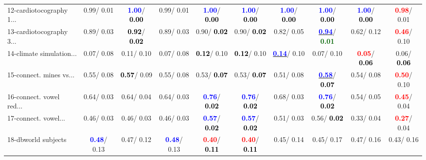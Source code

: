 \begin{table}[h]
\begin{center}
{\begin{tabular}{lc|c|c|c|c|c|c|c|c}
12-cardiotocography 1... &   0.99/  0.01 & \textcolor{blue}{\textbf{  1.00}}/\textcolor{black}{\textbf{  0.00}} &   0.99/  0.01 & \textcolor{blue}{\textbf{  1.00}}/\textcolor{black}{\textbf{  0.00}} & \textcolor{blue}{\textbf{  1.00}}/\textcolor{black}{\textbf{  0.00}} & \textcolor{blue}{\textbf{  1.00}}/\textcolor{black}{\textbf{  0.00}} & \textcolor{blue}{\textbf{  1.00}}/\textcolor{black}{\textbf{  0.00}} & \textcolor{blue}{\textbf{  1.00}}/\textcolor{black}{\textbf{  0.00}} & \textcolor{red}{\textbf{  0.98}}/  0.01 \\
13-cardiotocography 3... &   0.89/  0.03 & \textcolor{black}{\textbf{  0.92}}/\textcolor{black}{\textbf{  0.02}} &   0.89/  0.03 &   0.90/\textcolor{black}{\textbf{  0.02}} &   0.90/\textcolor{black}{\textbf{  0.02}} &   0.82/  0.05 & \underline{\textcolor{blue}{\textbf{  0.94}}}/\textcolor{darkgreen}{\textbf{  0.01}} &   0.62/  0.12 & \textcolor{red}{\textbf{  0.46}}/  0.10 \\
14-climate simulation... &   0.07/  0.08 &   0.11/  0.10 &   0.07/  0.08 & \textcolor{black}{\textbf{  0.12}}/  0.10 & \textcolor{black}{\textbf{  0.12}}/  0.10 & \underline{\textcolor{blue}{\textbf{  0.14}}}/  0.10 &   0.07/  0.10 & \textcolor{red}{\textbf{  0.05}}/\textcolor{black}{\textbf{  0.06}} &   0.06/\textcolor{black}{\textbf{  0.06}} \\ \hline
15-connect. mines vs... &   0.55/  0.08 & \textcolor{black}{\textbf{  0.57}}/  0.09 &   0.55/  0.08 &   0.53/\textcolor{black}{\textbf{  0.07}} &   0.53/\textcolor{black}{\textbf{  0.07}} &   0.51/  0.08 & \underline{\textcolor{blue}{\textbf{  0.58}}}/\textcolor{black}{\textbf{  0.07}} &   0.54/  0.08 & \textcolor{red}{\textbf{  0.50}}/  0.10 \\
16-connect. vowel red... &   0.64/  0.03 &   0.64/  0.04 &   0.64/  0.03 & \textcolor{blue}{\textbf{  0.76}}/\textcolor{black}{\textbf{  0.02}} & \textcolor{blue}{\textbf{  0.76}}/\textcolor{black}{\textbf{  0.02}} &   0.68/  0.03 & \textcolor{blue}{\textbf{  0.76}}/\textcolor{black}{\textbf{  0.02}} &   0.54/  0.05 & \textcolor{red}{\textbf{  0.45}}/  0.04 \\
17-connect. vowel... &   0.46/  0.03 &   0.46/  0.03 &   0.46/  0.03 & \textcolor{blue}{\textbf{  0.57}}/\textcolor{black}{\textbf{  0.02}} & \textcolor{blue}{\textbf{  0.57}}/\textcolor{black}{\textbf{  0.02}} &   0.51/  0.03 &   0.56/\textcolor{black}{\textbf{  0.02}} &   0.33/  0.04 & \textcolor{red}{\textbf{  0.27}}/  0.04 \\
18-dbworld subjects & \textcolor{blue}{\textbf{  0.48}}/  0.13 &   0.47/  0.12 & \textcolor{blue}{\textbf{  0.48}}/  0.13 & \textcolor{red}{\textbf{  0.40}}/\textcolor{black}{\textbf{  0.11}} & \textcolor{red}{\textbf{  0.40}}/\textcolor{black}{\textbf{  0.11}} &   0.45/  0.14 &   0.45/  0.17 &   0.47/  0.16 &   0.43/  0.16 \\

\end{tabular}}
\end{center}
\end{table}
